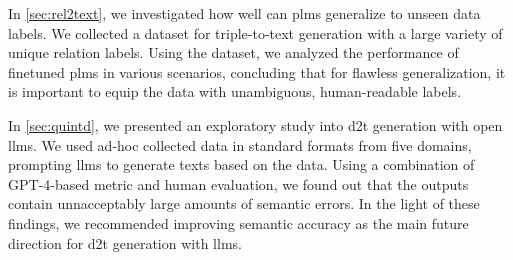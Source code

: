In \autoref{sec:rel2text}, we investigated how well can \acp{plm} generalize to unseen data labels. We collected a dataset for triple-to-text generation with a large variety of unique relation labels. Using the dataset, we analyzed the performance of finetuned \acp{plm} in various scenarios, concluding that for flawless generalization, it is important to equip the data with unambiguous, human-readable labels.


In \autoref{sec:quintd}, we presented an exploratory study into \ac{d2t} generation with open \acp{llm}. We used ad-hoc collected data in standard formats from five domains, prompting \acp{llm} to generate texts based on the data. Using a combination of GPT-4-based metric and human evaluation, we found out that the outputs contain unnacceptably large amounts of semantic errors. In the light of these findings, we recommended improving semantic accuracy as the main future direction for \ac{d2t} generation with \acp{llm}.





